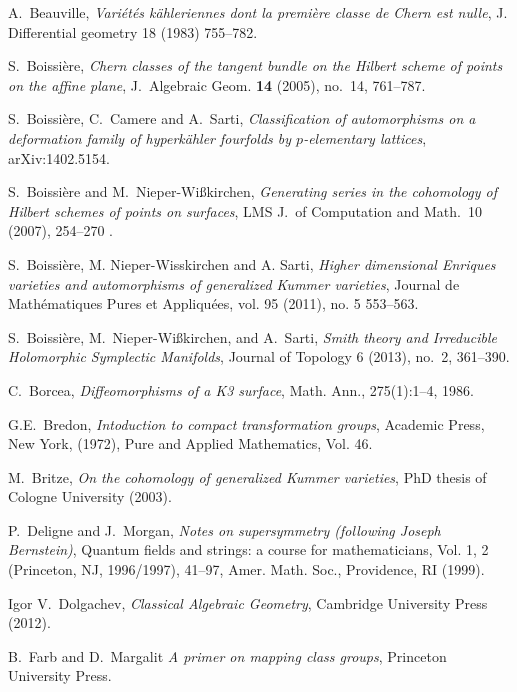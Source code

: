 
\begin{thebibliography}{10}

A.~Beauville, \emph{Vari\'et\'es k\"ahleriennes dont la premi\`ere classe de Chern est nulle}, 
  J. Differential geometry 18 (1983) 755--782.

S.~Boissi\`ere, \emph{Chern classes of the tangent bundle on the Hilbert scheme of points
  on the affine plane}, J.~Algebraic Geom. \textbf{14} (2005), no.~14, 761--787.

S.~Boissi\`ere, C.~Camere and A.~Sarti, \emph{Classification of automorphisms on a deformation family of hyperk\"ahler
fourfolds by $p$-elementary lattices}, arXiv:1402.5154.

S.~Boissi\`ere and M.~Nieper-Wi{\ss}kirchen, \emph{Generating series in the cohomology 
  of Hilbert schemes of points on surfaces}, LMS J.~of Computation and Math.~10 (2007), 254--270 .

S.~Boissi\`ere, M. Nieper-Wisskirchen and A. Sarti, 
\emph{Higher dimensional Enriques varieties and automorphisms of generalized Kummer varieties},
Journal de Math\'ematiques Pures et Appliqu\'ees,
vol. 95 (2011), no. 5 553--563.

S.~Boissi\`ere, M.~Nieper-Wi{\ss}kirchen, and A.~Sarti, \emph{Smith theory and 
  Irreducible Holomorphic Symplectic Manifolds}, Journal of Topology 6 (2013), no.~2, 361--390.

C.~Borcea,
\emph{Diffeomorphisms of a K3 surface},
Math. Ann., 275(1):1--4, 1986.

G.E.~Bredon,
\newblock \emph{Intoduction to compact transformation groups},
Academic Press, New York,
(1972), Pure and Applied Mathematics, Vol. 46.

M.~Britze, \emph{On the cohomology of generalized Kummer varieties}, PhD thesis of Cologne University (2003).

P.~Deligne and J.~Morgan, \emph{Notes on supersymmetry (following Joseph Bernstein)}, Quantum
fields and strings: a course for mathematicians, Vol. 1, 2 (Princeton, NJ, 1996/1997), 41--97,
Amer. Math. Soc., Providence, RI (1999).

Igor V.~Dolgachev, \emph{Classical Algebraic Geometry}, 
  Cambridge University Press (2012).

B.~Farb and D.~Margalit \emph{A primer on mapping class groups}, Princeton University Press.


\end{thebibliography}
